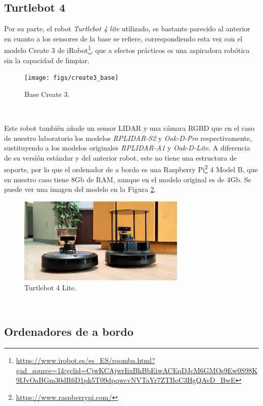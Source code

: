 \subsection{Turtlebot 4}
\label{sec:turtlebot4}

Por su parte, el robot \textit{Turtlebot 4 lite} utilizado, es bastante parecido
al anterior en cuanto a los sensores de la base se refiere, correspondiendo esta
vez con el modelo Create 3 de
iRobot\footnote{\url{https://www.irobot.es/es_ES/roomba.html?gad_source=1&gclid=CjwKCAjwrIixBhBbEiwACEqDJcM6GMOs9Ew0S98K9IJvOaBGm30dR6D1pk5T09dpqwcvNVTaYr7ZTBoC3HgQAvD_BwE}},
que a efectos prácticos es una aspiradora robótica sin la capacidad de limpiar.

\begin{figure} [h!]
    \begin{center}
      \texttt{[image: figs/create3\_base]}
    \end{center}
    \caption{Base Create 3.}
    \label{fig:base_create3}
  \end{figure}\

Este robot también añade un sensor LIDAR y una cámara RGBD que en el caso de
nuestro laboratorio los modelos \textit{RPLIDAR-S2} y \textit{Oak-D-Pro}
respectivamente, sustituyendo a los modelos originales \textit{RPLIDAR-A1} y
\textit{Oak-D-Lite}.
A diferencia de su versión estándar y del anterior robot, este no tiene una
estructura de soporte, por lo que el ordenador de a bordo es una Raspberry
Pi\footnote{\url{https://www.raspberrypi.com/}} 4 Model B, que en nuestro caso
tiene 8Gb de RAM, aunque en el modelo original es de 4Gb.
Se puede ver una imagen del modelo en la Figura \ref{fig:turtlebot4}.

\begin{figure} [h!]
  \begin{center}
    \includegraphics[width=8cm]{figs/turtlebot4}
  \end{center}
  \caption{Turtlebot 4 Lite.}
  \label{fig:turtlebot4}
\end{figure}\


\subsection{Ordenadores de a bordo}
\label{sec:a_bordo}

